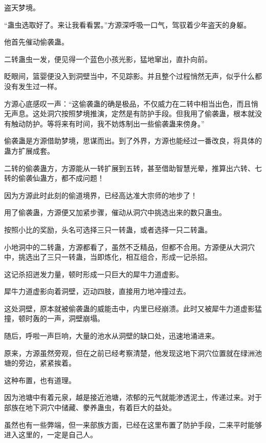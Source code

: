 
\begin{this_body}



盗天梦境。

“蛊虫选取好了。来让我看看罢。”方源深呼吸一口气，驾驭着少年盗天的身躯。

他首先催动偷袭蛊。

二转蛊虫一发，便见得一个蓝色小孩光影，猛地窜出，直扑向前。

眨眼间，篮婴便没入到洞壁当中，不见踪影。并且整个过程悄然无声，似乎什么都没有发生过一样。

方源心底感叹一声：“这偷袭蛊的确是极品，不仅威力在二转中相当出色，而且悄无声息。这处洞穴按照梦境推演，定然是有防护手段。但我用了偷袭蛊，根本就没有触动防护。等将来有时间，我不妨炼制出一些偷袭蛊来傍身。”

偷袭蛊是方源借助梦境，思谋而出。到了外界，方源也能经过一番改良，将具体的蛊方扩展成套。

二转的偷袭蛊方，方源能从一转扩展到五转，甚至借助智慧光晕，推算出六转、七转的偷袭仙蛊方，都不成问题！

因为方源此时此刻的偷道境界，已经高达准大宗师的地步了！

用了偷袭蛊，方源便又加紧步骤，催动从洞穴中挑选出来的数只蛊虫。

按照小比的奖励，头名可选择三只一转蛊，或者选择一只二转蛊。

小地洞中的二转蛊，方源都看了，虽然不乏精品，但都不合用。方源便从大洞穴中，挑选出了三只一转蛊，当即炼化，相互组合，形成一记杀招。

这记杀招迸发力量，顿时形成一只巨大的犀牛力道虚影。

犀牛力道虚影向着洞壁，迈动四肢，直接用力地冲撞过去。

这处洞壁，原本就被偷袭蛊的威能击中，内里已经崩溃。此时又被犀牛力道虚影猛撞，顿时轰的一声，洞壁崩塌。

随后，呼啦一声巨响，大量的池水从洞壁的缺口处，迅速地涌进来。

原来，方源虽然旁观，但在之前已经考察清楚，他发现这地下洞穴位置就在绿洲池塘的旁边，紧紧挨着。

这种布置，也有道理。

因为池塘中有着元泉，越是接近池塘，浓郁的元气就能渗透泥土，传递过来。对于部族在地下洞穴中储藏、豢养蛊虫，有着巨大的益处。

虽然也有一些弊端，但一来部族方面，已经在这里布置了防护手段，二来平时能够进入这里的，一定是自己人。


\end{this_body}
